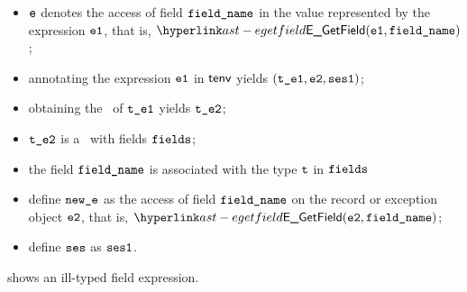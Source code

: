 \ProseParagraph
\AllApply
\begin{itemize}
  \item $\ve$ denotes the access of field $\fieldname$ in the value represented by the expression $\veone$, that is, $\EGetField(\veone, \fieldname)$;
  \item annotating the expression $\veone$ in $\tenv$ yields $(\vteone, \vetwo, \vsesone)$\ProseOrTypeError;
  \item obtaining the \underlyingtype\ of $\vteone$ yields $\vtetwo$\ProseOrTypeError;
  \item $\vtetwo$ is a \structuredtype\ with fields $\fields$;
  \item the field $\fieldname$ is associated with the type $\vt$ in $\fields$
  \item define $\newe$ as the access of field $\fieldname$ on the record or exception object $\vetwo$, that is, $\EGetField(\vetwo, \fieldname)$;
  \item define $\vses$ as $\vsesone$.
\end{itemize}
\FormallyParagraph
\begin{mathpar}
\end{mathpar}

 shows an ill-typed field expression.

